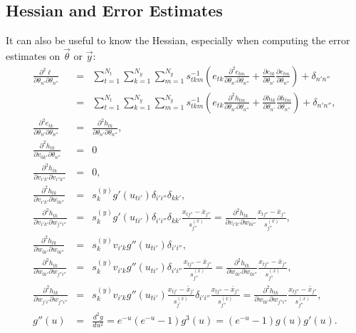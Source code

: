 \documentclass{article}    %
\begin{document}
\subsection{Hessian and Error Estimates}

It can also be useful to know the Hessian, especially when computing the error estimates on $\vec{\theta}$ or $\vec{y}$:
\begin{eqnarray}
\frac{\partial^2\ell}{\partial \theta_{n'}\partial \theta_{n''}} &=& 
\sum_{t=1}^{N_t}\sum_{k=1}^{N_y} \sum_{m=1}^{N_y}
 s^{-1}_{tkm}\left(e_{tk}\frac{\partial^2 e_{tm}}{\partial\theta_{n'}\partial\theta_{n''}} 
+
 \frac{\partial e_{tk}}{\partial\theta_{n'}}\frac{\partial e_{tm}}{\partial\theta_{n''}}\right) + \delta_{n'n''}\\
&=&
\sum_{t=1}^{N_t}\sum_{k=1}^{N_y}\sum_{m=1}^{N_y} 
s^{-1}_{tkm} \left( 
e_{tk}\frac{\partial^2 h_{tm}}{\partial\theta_{n'}\partial\theta_{n''}}
+
\frac{\partial h_{tk}}{\partial\theta_{n'}}\frac{\partial h_{tm}}{\partial\theta_{n''}} 
\right) + \delta_{n'n''}
,\\
\frac{\partial^2 e_{tk}}{\partial\theta_{n'}\partial\theta_{n''}} &=& \frac{\partial^2 h_{tk}}{\partial\theta_{n'}\partial\theta_{n''}}, \\
\frac{\partial^2 h_{tk}}{\partial v_{0k'}\partial \theta_{n''}} &=& 0 \\
\frac{\partial^2 h_{tk}}{\partial v_{i'k'}\partial v_{i''k''}} &=& 0, \\
\frac{\partial^2 h_{tk}}{\partial v_{i'k'}\partial w_{0i''}} &=& s^{(y)}_k g'(u_{ti'}) \delta_{i'i''}\delta_{kk'}, \\
\frac{\partial^2 h_{tk}}{\partial v_{i'k'}\partial w_{j''i''}} &=& s^{(y)}_k g'(u_{ti'})\delta_{i'i''}\delta_{kk'}\frac{x_{tj''}-\bar{x}_{j''}}{s^{(x)}_{j''}}
 = \frac{\partial^2 h_{tk}}{\partial v_{i'k'}\partial w_{0i''}}\frac{x_{tj''}-\bar{x}_{j''}}{s^{(x)}_{j''}} , \\
\frac{\partial^2 h_{tk}}{\partial w_{0i'}\partial w_{0i''}} &=& s^{(y)}_k v_{i'k} g''(u_{ti'}) \delta_{i'i''}, \\
\frac{\partial^2 h_{tk}}{\partial w_{0i'}\partial w_{j''i''}} &=& s^{(y)}_k v_{i'k} g''(u_{ti'})\delta_{i'i''}\frac{x_{tj''}-\bar{x}_{j''}}{s^{(x)}_{j''}}
 = \frac{\partial^2 h_{tk}}{\partial w_{0i'}\partial w_{0i''}}\frac{x_{tj''}-\bar{x}_{j''}}{s^{(x)}_{j''}}, \\
\frac{\partial^2 h_{tk}}{\partial w_{j'i'}\partial w_{j''i''}} &=& s^{(y)}_k v_{i'k} g''(u_{ti'}) \frac{x_{tj'}-\bar{x}_{j'}}{s^{(x)}_{j'}} \delta_{i'i''} \frac{x_{tj''}-\bar{x}_{j''}}{s^{(x)}_{j''}}
 = \frac{\partial^2 h_{tk}}{\partial w_{0i'}\partial w_{j''i''}}\frac{x_{tj''}-\bar{x}_{j''}}{s^{(x)}_{j''}}, \\
g''(u) &=& \frac{d^2g}{du^2} = e^{-u}(e^{-u}-1)g^3(u) = (e^{-u}-1)g(u)g'(u).
\end{eqnarray}
\end{document}
